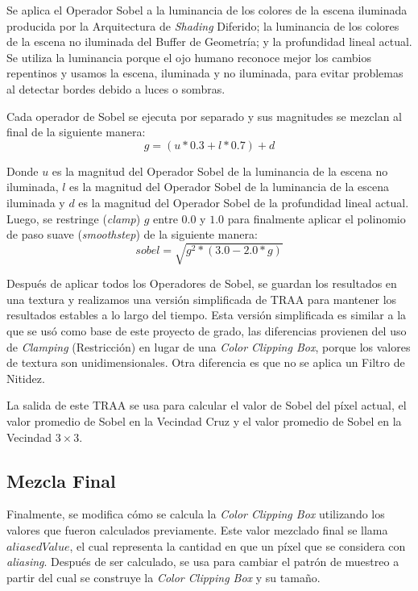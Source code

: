 \documentclass[pregrado]{tesis-usb} %
\begin{document}
Se aplica el Operador Sobel a la luminancia de los colores de la escena iluminada producida por la Arquitectura de \textit{Shading} Diferido; la luminancia de los colores de la escena no iluminada del Buffer de Geometría; y la profundidad lineal actual. Se utiliza la luminancia porque el ojo humano reconoce mejor los cambios repentinos y usamos la escena, iluminada y no iluminada, para evitar problemas al detectar bordes debido a luces o sombras.

Cada operador de Sobel se ejecuta por separado y sus magnitudes se mezclan al final de la siguiente manera:
\begin{equation} \label{eq:sobel_g}
	g=(u*0.3 +l*0.7)+d 
\end{equation}

Donde $u$ es la magnitud del Operador Sobel de la luminancia de la escena no iluminada, $l$ es la magnitud del Operador Sobel de la luminancia de la escena iluminada y $d$ es la magnitud del Operador Sobel de la profundidad lineal actual. \\

Luego, se restringe (\textit{clamp}) $g$ entre $0.0$ y $1.0$ para finalmente aplicar el polinomio de paso suave (\textit{smoothstep}) de la siguiente manera:
\begin{equation} \label{eq:sobel_sqrt}
sobel=\sqrt{g^2*(3.0-2.0*g)} 
\end{equation}

Después de aplicar todos los Operadores de Sobel, se guardan los resultados en una textura y realizamos una versión simplificada de TRAA para mantener los resultados estables a lo largo del tiempo. Esta versión simplificada es similar a la que se usó como base de este proyecto de grado, las diferencias provienen del uso de \textit{Clamping} (Restricción) en lugar de una \textit{Color Clipping Box}, porque los valores de textura son unidimensionales. Otra diferencia es que no se aplica un Filtro de Nitidez.

La salida de este TRAA se usa para calcular el valor de Sobel del píxel actual, el valor promedio de Sobel en la Vecindad Cruz y el valor promedio de Sobel en la Vecindad $3\times 3$.

\subsection{Mezcla Final}
Finalmente, se modifica cómo se calcula la \textit{Color Clipping Box} utilizando los valores que fueron calculados previamente. Este valor mezclado final se llama $aliasedValue$, el cual representa la cantidad en que un píxel que se considera con \textit{aliasing}. Después de ser calculado, se usa para cambiar el patrón de muestreo a partir del cual se construye la \textit{Color Clipping Box} y su tamaño.
\end{document}
